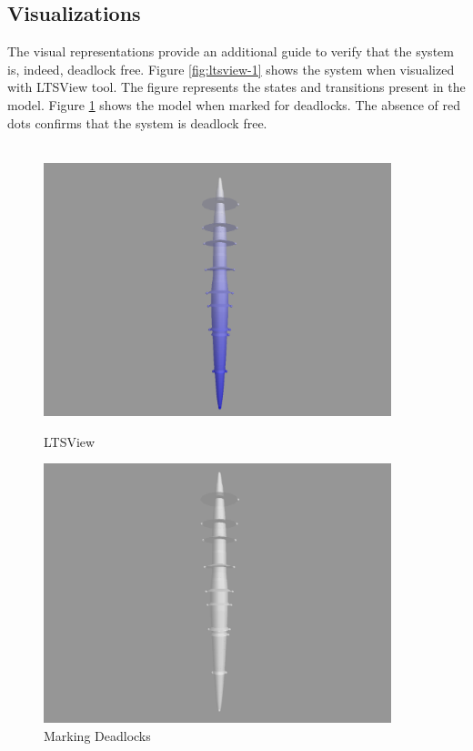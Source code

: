 \documentclass[a4paper,12pt]{article}
\begin{document}
	\subsection{Visualizations}
	The visual representations provide an additional guide to verify that the system is, indeed, deadlock free. Figure \ref{fig:ltsview-1} shows the system when visualized with LTSView tool. The figure represents the states and transitions present in the model. Figure \ref{fig:deadlockfree} shows the model when marked for deadlocks. The absence of red dots confirms that the system is deadlock free.
	\\
	\\
	\begin{figure}[ht]
		\centering
		\begin{minipage}{0.45\textwidth}
			\centering
			\includegraphics[width=0.9\textwidth]{3D-Model.png} \caption{LTSView}
			\label{fig:ltsview-1}
		\end{minipage}\hfill
		\begin{minipage}{0.45\textwidth}
			\centering
			\includegraphics[width=0.9\textwidth]{Deadlockfree.png} 
			\caption{Marking Deadlocks}
			\label{fig:deadlockfree}
		\end{minipage}
	\end{figure}
	\newpage
\end{document}
